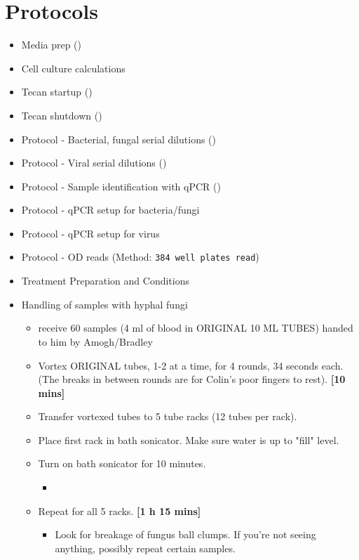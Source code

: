 \documentclass{article}
\begin{document}
\section{Protocols}
\begin{itemize}
    \item Media prep ()
    \item Cell culture calculations
    \item Tecan startup ()
    \item Tecan shutdown ()
    \item Protocol - Bacterial, fungal serial dilutions ()
    \item Protocol - Viral serial dilutions ()
    \item Protocol - Sample identification with qPCR  ()
    \item Protocol - qPCR setup for bacteria/fungi 
    \item Protocol - qPCR setup for virus 
    \item Protocol - OD reads (Method: \texttt{384 well plates read})
    \item Treatment Preparation and Conditions 
    \item Handling of samples with hyphal fungi 
    \begin{itemize}
        \item receive 60 samples (4 ml of blood in ORIGINAL 10 ML TUBES) handed to him by Amogh/Bradley
        \item Vortex ORIGINAL tubes, 1-2 at a time, for 4 rounds, 34 seconds each. (The breaks in between rounds are for Colin's poor fingers to rest). \textbf{[10 mins]}
        \item Transfer vortexed tubes to 5 tube racks (12 tubes per rack).
        \item Place first rack in bath sonicator. Make sure water is up to "fill" level.
        \item Turn on bath sonicator for 10 minutes. 
        \begin{itemize}
            \item 
        \end{itemize}
        \item Repeat for all 5 racks. \textbf{[1 h 15 mins]}
        \begin{itemize}
            \item Look for breakage of fungus ball clumps. If you're not seeing anything, possibly repeat certain samples.

\end{itemize}
\end{itemize}
\end{itemize}
\end{document}
